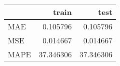 \begin{tabular}{lrr}
\toprule
{} &      train &       test \\
\midrule
MAE  &   0.105796 &   0.105796 \\
MSE  &   0.014667 &   0.014667 \\
MAPE &  37.346306 &  37.346306 \\
\bottomrule
\end{tabular}
